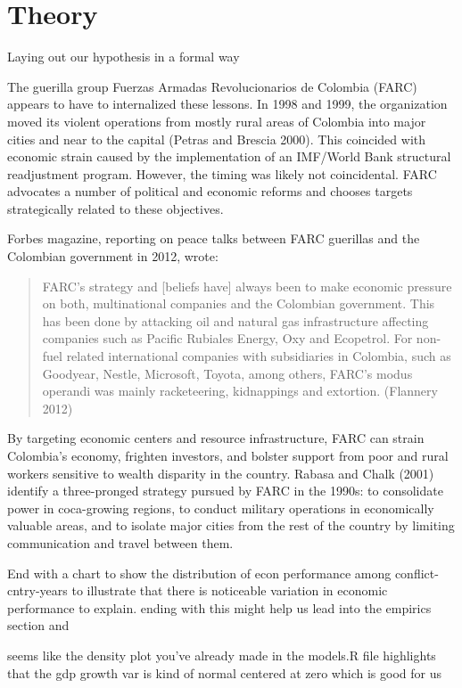 \section{Theory}
\label{theory}


Laying out our hypothesis in a formal way

The guerilla group Fuerzas Armadas Revolucionarios de Colombia (FARC) appears to have to internalized these lessons.  In 1998 and 1999, the organization moved its violent operations from mostly rural areas of Colombia into major cities and near to the capital (Petras and Brescia 2000).  This coincided with economic strain caused by the implementation of an IMF/World Bank structural readjustment program.  However, the timing was likely not coincidental.  FARC advocates a number of political and economic reforms and chooses targets strategically related to these objectives.

Forbes magazine, reporting on peace talks between FARC guerillas and the Colombian government in 2012, wrote: 
\begin{quote}FARC's strategy and [beliefs have] always been to make economic pressure on both, multinational companies and the Colombian government. This has been done by attacking oil and natural gas infrastructure affecting companies such as Pacific Rubiales Energy, Oxy and Ecopetrol. For non-fuel related international companies with subsidiaries in Colombia, such as Goodyear, Nestle, Microsoft, Toyota, among others, FARC’s modus operandi was mainly racketeering, kidnappings and extortion. (Flannery 2012)\end{quote}
By targeting economic centers and resource infrastructure, FARC can strain Colombia's economy, frighten investors, and bolster support from poor and rural workers sensitive to wealth disparity in the country.  Rabasa and Chalk (2001) identify a three-pronged strategy pursued by FARC in the 1990s: to consolidate power in coca-growing regions, to conduct military operations in economically valuable areas, and to isolate major cities from the rest of the country by limiting communication and travel between them.    


End with a chart to show the distribution of econ performance among conflict-cntry-years to illustrate that there is noticeable variation in economic performance to explain. ending with this might help us lead into the empirics section and 

	seems like the density plot you've already made in the models.R file highlights that the gdp growth var is kind of normal centered at zero which is good for us	